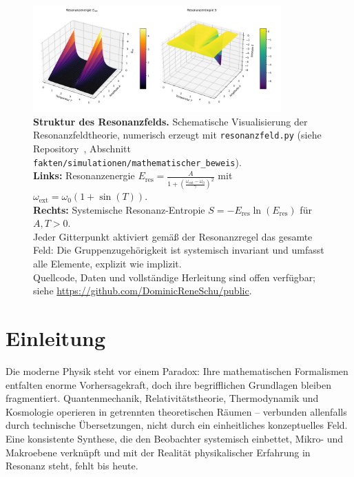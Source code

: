 \documentclass[12pt]{iopart}
\begin{document}
\begin{figure}[ht]
	\centering
	\includegraphics[width=0.85\textwidth]{figures/plot.png}
	\caption{
		\textbf{Struktur des Resonanzfelds.}
		Schematische Visualisierung der Resonanzfeldtheorie, numerisch erzeugt mit \texttt{resonanzfeld.py} (siehe Repository~\cite{rftrepo}, Abschnitt \texttt{fakten/simulationen/mathematischer\_beweis}).\\
		\textbf{Links:} Resonanzenergie $E_{\mathrm{res}} = \frac{A}{1 + \left(\frac{\omega_\mathrm{ext} - \omega_0}{\gamma}\right)^2}$ mit $\omega_\mathrm{ext} = \omega_0 (1 + \sin(T))$.\\
		\textbf{Rechts:} Systemische Resonanz-Entropie $S = -E_{\mathrm{res}}\ln(E_{\mathrm{res}})$ für $A, T > 0$.\\
		Jeder Gitterpunkt aktiviert gemäß der Resonanzregel das gesamte Feld: Die Gruppenzugehörigkeit ist systemisch invariant und umfasst alle Elemente, explizit wie implizit.\\
		Quellcode, Daten und vollständige Herleitung sind offen verfügbar; siehe \url{https://github.com/DominicReneSchu/public}.
	}
	\label{fig:resonance_field_plot}
\end{figure}

	\newpage
	\section{Einleitung}
	
	Die moderne Physik steht vor einem Paradox: Ihre mathematischen Formalismen entfalten enorme Vorhersagekraft, doch ihre begrifflichen Grundlagen bleiben fragmentiert. Quantenmechanik, Relativitätstheorie, Thermodynamik und Kosmologie operieren in getrennten theoretischen Räumen – verbunden allenfalls durch technische Übersetzungen, nicht durch ein einheitliches konzeptuelles Feld. Eine konsistente Synthese, die den Beobachter systemisch einbettet, Mikro- und Makroebene verknüpft und mit der Realität physikalischer Erfahrung in Resonanz steht, fehlt bis heute.
	
\end{document}
